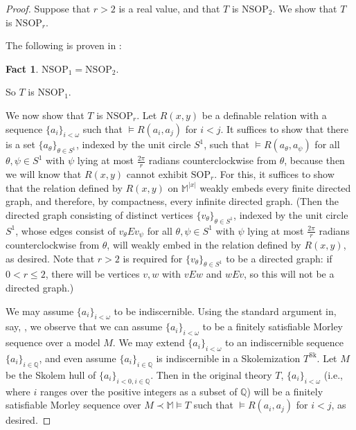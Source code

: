 \documentclass{amsart}
\newtheorem{fact}[theorem]{Fact}
\theoremstyle{definition}
\theoremstyle{remark}
\numberwithin{equation}{section}
\begin{document}
\begin{proof}
    Suppose that $r > 2$ is a real value, and that $T$ is $\mathrm{NSOP}_{2}$. We show that $T$ is $\mathrm{NSOP}_{r}$.

    The following is proven in \cite{NSOP2}:

    \begin{fact}\label{Application of nsop1 = nsop2}
        $\mathrm{NSOP}_{1}=\mathrm{NSOP}_{2}.$
    \end{fact}


    So $T$ is $\mathrm{NSOP}_{1}$.

    We now show that $T$ is $\mathrm{NSOP}_{r}$. Let $R(x, y)$ be a definable relation with a sequence $\{a_{i}\}_{i < \omega}$ such that $\models R(a_{i}, a_{j})$ for $i <j$. It suffices to show that there is a set $\{a_{\theta}\}_{\theta \in S^{1}}$, indexed by the unit circle $S^{1}$, such that $\models R(a_{\theta}, a_{\psi})$ for all $\theta, \psi \in S^{1}$ with $\psi$ lying at most $\frac{2\pi}{r}$ radians counterclockwise from $\theta$, because then we will know that $R(x, y)$ cannot exhibit $\mathrm{SOP}_{r}$. For this, it suffices to show that the relation defined by $R(x, y)$ on $\mathbb{M}^{|x|}$ weakly embeds every finite directed graph, and therefore, by compactness, every infinite directed graph. (Then the directed graph consisting of distinct vertices $\{v_{\theta}\}_{\theta \in S^{1}}$, indexed by the unit circle $S^{1}$, whose edges consist of $v_{\theta}Ev_{\psi}$ for all $\theta, \psi \in S^{1}$ with $\psi$ lying at most $\frac{2\pi}{r}$ radians counterclockwise from $\theta$, will weakly embed in the relation defined by $R(x, y)$, as desired. Note that $r > 2$ is required for $\{v_{\theta}\}_{\theta \in S^{1}}$ to be a directed graph: if $0 < r \leq 2 $, there will be vertices $v, w$ with $vEw$ and $w E v$, so this will not be a directed graph.)

    We may assume $\{a_{i}\}_{i < \omega}$ to be indiscernible. Using the standard argument in, say, \cite{KR17}, we observe that we can assume $\{a_{i}\}_{i < \omega}$ to be a finitely satisfiable Morley sequence over a model $M$.  We may extend $\{a_{i}\}_{i < \omega}$ to an indiscernible sequence $\{a_{i}\}_{i \in \mathbb{Q}}$, and even assume $\{a_{i}\}_{i \in \mathbb{Q}}$ is indiscernible in a Skolemization $T^{\mathrm{Sk}}$. Let $M$ be the Skolem hull of $\{a_{i}\}_{i< 0, i \in \mathbb{Q}}$. Then in the original theory $T$, $\{a_{i}\}_{i < \omega}$ (i.e., where $i$ ranges over the positive integers as a subset of $\mathbb{Q}$) will be a finitely satisfiable Morley sequence over $M \prec \mathbb{M} \models T$ such that $\models R(a_{i}, a_{j})$ for $i <j$, as desired.


\end{proof}
\end{document}
